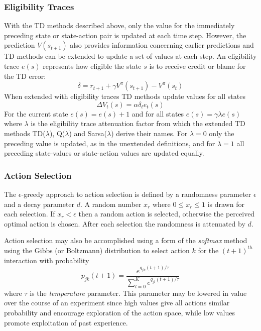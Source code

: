 \subsubsection{Eligibility Traces}
\label{sec:eligibility}
With the TD methods described above, only the value for the immediately
preceding state or state-action pair is updated at each time step.  However,
the prediction $V(s_{t+1})$ also provides information concerning earlier
predictions and TD methods can be extended to update a set of values at each step.  An eligibility trace $e(s)$ represents how eligible the state $s$ is to receive
credit or blame for the TD error:
\begin{equation}
\delta = r_{t+1} + \gamma V^\pi(s_{t+1}) - V^\pi(s_t)
\end{equation}
When extended with eligibility traces TD methods update values for all states
\begin{equation}
\Delta V_t(s) = \alpha \delta_t e_t(s)
\end{equation}
For the current state $e(s) = e(s) + 1$ and for all states
$e(s) = \gamma \lambda e(s)$ where $\lambda$ is the eligibility trace
attenuation factor from which the extended TD methods TD($\lambda$),
Q($\lambda$) and Sarsa($\lambda$) derive their names. For $\lambda = 0$ only
the preceding value is updated, as in the unextended definitions,
and for $\lambda = 1$ all preceding state-values or state-action values are
updated equally.

\subsubsection{Action Selection}
The $\epsilon$-greedy approach to action selection is defined by a randomness
parameter $\epsilon$ and a decay parameter $d$.  A random number $x_r$ where
$0 \leq x_r \leq 1$ is drawn for each selection.  If $x_r < \epsilon$ then a
random action is selected, otherwise the perceived optimal action is chosen.
After each selection the randomness is attenuated by $d$.

Action selection may also be accomplished using a form of the \textit{softmax}
method \cite[\S2]{suttonbarto:1998} using the Gibbs (or
Boltzmann) distribution to select action $k$ for the $(t+1)^{th}$ interaction with probability
\begin{equation}
p_{jk}(t+1) = \frac{e^{q_{jk}(t+1)/\tau}}{\sum_{l=0}^K e^{q_{jl}(t+1)/\tau}}
\end{equation}
where $\tau$ is the \textit{temperature} parameter.  This parameter may be
lowered in value over the course of an experiment since high values give all
actions similar probability and encourage exploration of the action space,
while low values promote exploitation of past experience.

